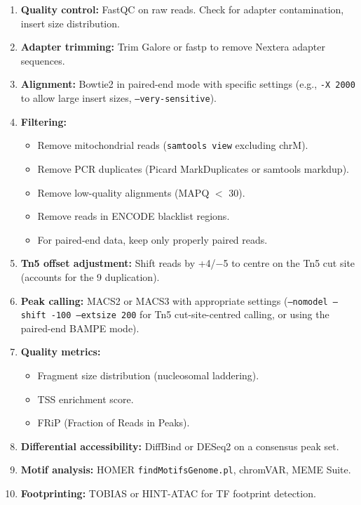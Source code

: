 \begin{enumerate}[itemsep=2pt]
  \item \textbf{Quality control:} FastQC on raw reads. Check for adapter contamination, insert size distribution.
  \item \textbf{Adapter trimming:} Trim Galore or fastp to remove Nextera adapter sequences.
  \item \textbf{Alignment:} Bowtie2 in paired-end mode with specific settings (e.g., \texttt{-X 2000} to allow large insert sizes, \texttt{--very-sensitive}).
  \item \textbf{Filtering:}
    \begin{itemize}[itemsep=1pt]
      \item Remove mitochondrial reads (\texttt{samtools view} excluding chrM).
      \item Remove PCR duplicates (Picard MarkDuplicates or samtools markdup).
      \item Remove low-quality alignments (MAPQ $<$ 30).
      \item Remove reads in ENCODE blacklist regions.
      \item For paired-end data, keep only properly paired reads.
    \end{itemize}
  \item \textbf{Tn5 offset adjustment:} Shift reads by +4/$-$5\basepair{} to centre on the Tn5 cut site (accounts for the 9\basepair{} duplication).
  \item \textbf{Peak calling:} MACS2 or MACS3 with appropriate settings (\texttt{--nomodel --shift -100 --extsize 200} for Tn5 cut-site-centred calling, or using the paired-end BAMPE mode).
  \item \textbf{Quality metrics:}
    \begin{itemize}[itemsep=1pt]
      \item Fragment size distribution (nucleosomal laddering).
      \item TSS enrichment score.
      \item FRiP (Fraction of Reads in Peaks).
    \end{itemize}
  \item \textbf{Differential accessibility:} DiffBind or DESeq2 on a consensus peak set.
  \item \textbf{Motif analysis:} HOMER \texttt{findMotifsGenome.pl}, chromVAR, MEME Suite.
  \item \textbf{Footprinting:} TOBIAS or HINT-ATAC for TF footprint detection.
\end{enumerate}

